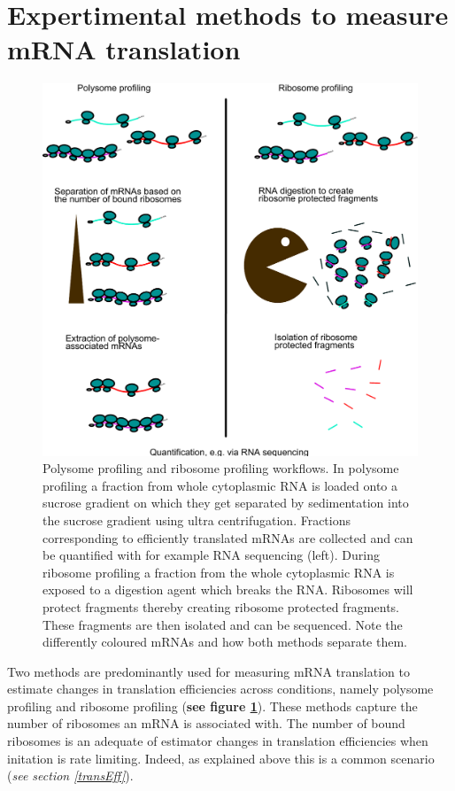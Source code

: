 \documentclass[12pt,openany]{book}
\begin{document}
\clearpage
\section{Expertimental methods to measure mRNA translation} \label{exptMethod}

\begin{figure}
    \includegraphics{./figures/polyRibo.pdf}
  \caption{Polysome profiling and ribosome profiling workflows. In polysome profiling a fraction from whole cytoplasmic RNA is loaded onto a sucrose gradient on which they get separated by sedimentation into the sucrose gradient using ultra centrifugation. Fractions corresponding to efficiently translated mRNAs are collected and can be quantified with for example RNA sequencing (left). During ribosome profiling a fraction from the whole cytoplasmic RNA is exposed to a digestion agent which breaks the RNA. Ribosomes will protect fragments thereby creating ribosome protected fragments. These fragments are then isolated and can be sequenced. Note the differently coloured mRNAs and how both methods separate them. \label{fig:polyRibo}}
\end{figure}

Two methods are predominantly used for measuring mRNA translation to
estimate changes in translation efficiencies across conditions, namely
polysome profiling and ribosome profiling (\textbf{see figure
\ref{fig:polyRibo}}). These methods capture the number of ribosomes an
mRNA is associated with. The number of bound ribosomes is an adequate of
estimator changes in translation efficiencies when initation is rate
limiting. Indeed, as explained above this is a common scenario
(\emph{see section \ref{transEff}}).
\end{document}
